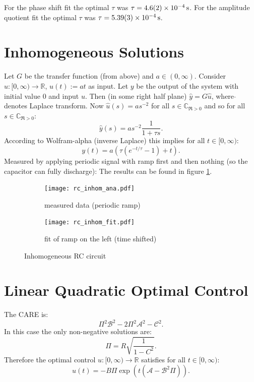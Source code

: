 \documentclass[10pt, a4paper]{article} %
\begin{document}
For the phase shift fit the optimal $\tau$ was $\tau = \SI{4.6 \pm 0.2 e-4}{\second}$.
For the amplitude quotient fit the optimal $\tau$ was $\tau = \SI{5.39 \pm 0.03 e-4}{\second}$.
\section{Inhomogeneous Solutions}
Let $G$ be the transfer function (from above) and $a \in (0, \infty)$.
Consider $u :[0, \infty) \to \mathbb{R}$, $u(t):=a t$ as input.
Let $y$ be the output of the system with initial value $0$ and input $u$.
Then (in some right half plane) $\hat y = G  \hat u$, where $\hat{}$ denotes Laplace transform.
Now $\hat u(s) = a s^{-2}$ for all $s \in \mathbb{C}_{\Re >0}$ and so for all $s \in \mathbb{C}_{\Re >0}$:
\begin{equation*}
	\hat y (s) = a s^{-2} \frac{1}{1+ \tau s}.
\end{equation*}
According to Wolfram-alpha (inverse Laplace) this implies for all $t\in[0, \infty)$:
\begin{equation*}
	y (t) = a(\tau ( e^{-t /\tau } -1) + t).
\end{equation*}
Measured by applying periodic signal with ramp first and then nothing (so the capacitor can fully discharge):
The results can be found in figure \ref{fig:rc_inhom}.
  \begin{figure}
     \centering
     \begin{subfigure}{0.495\textwidth}
	     \texttt{[image: rc\_inhom\_ana.pdf]}
	     \caption{measured data (periodic ramp)}
     \end{subfigure}
	  \begin{subfigure}{0.495\textwidth}
	     \texttt{[image: rc\_inhom\_fit.pdf]}
		  \caption{fit of ramp on the left (time shifted)}
     \end{subfigure}
	  \caption{Inhomogeneous RC circuit}
        \label{fig:rc_inhom}
\end{figure}
\section{Linear Quadratic Optimal Control}
The CARE is:
\begin{equation*}
	\Pi^2 \mathcal{B}^2 - 2 \Pi^2 \mathcal{A}^2 - \mathcal{C}^2.
\end{equation*}
In this case the only non-negative solutions are:
\begin{equation*}
	\Pi = R \sqrt{\frac{1}{1-C^2}}.
\end{equation*}
Therefore the optimal control $u:[0, \infty) \to \mathbb{R}$ satisfies for all $t\in [0,\infty)$:
\begin{equation*}
	u (t) = - B \Pi \exp ( t (\mathcal{A}- \mathcal{B}^2 \Pi)).
\end{equation*}
\end{document}
